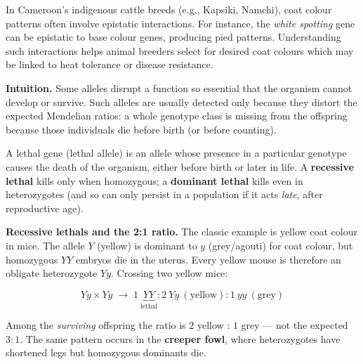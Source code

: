 \documentclass[11pt]{article}
\newcommand{\cle}[1]{{\popxbold\color{popdark}#1}}
\newcounter{popsec}
\newcounter{popsub}
\newcommand{\courssub}[1]{%
  \stepcounter{popsub}%
  \par\vspace{9pt}\noindent{\popxbold\fontsize{11.5}{13}\selectfont\color{popink}{\color{poporange}\thepopsec.\thepopsub}\hspace{6pt}#1}\par\nopagebreak\vspace{4pt}
}
\begin{document}
\begin{savaistu}
In Cameroon's indigenous cattle breeds (e.g., Kapsiki, Namchi), coat colour patterns often involve epistatic interactions. For instance, the \emph{white spotting} gene can be epistatic to base colour genes, producing pied patterns. Understanding such interactions helps animal breeders select for desired coat colours which may be linked to heat tolerance or disease resistance.
\end{savaistu}

\courssub{Lethal Genes}

\textbf{Intuition.} Some alleles disrupt a function so essential that the organism cannot develop or survive. Such alleles are usually detected only because they distort the expected Mendelian ratios: a whole genotype class is missing from the offspring because those individuals die before birth (or before counting).

\begin{definition}
A \cle{lethal gene} (lethal allele) is an allele whose presence in a particular genotype causes the death of the organism, either before birth or later in life. A \textbf{recessive lethal} kills only when homozygous; a \textbf{dominant lethal} kills even in heterozygotes (and so can only persist in a population if it acts \emph{late}, after reproductive age).
\end{definition}

\textbf{Recessive lethals and the 2:1 ratio.} The classic example is yellow coat colour in mice. The allele $Y$ (yellow) is dominant to $y$ (grey/agouti) for coat colour, but homozygous $YY$ embryos die in the uterus. Every yellow mouse is therefore an obligate heterozygote $Yy$. Crossing two yellow mice:

\[ Yy \times Yy \;\longrightarrow\; 1\ \underbrace{YY}_{\text{lethal}} : 2\ Yy\ (\text{yellow}) : 1\ yy\ (\text{grey}) \]

Among the \emph{surviving} offspring the ratio is $2$ yellow : $1$ grey — not the expected $3:1$. The same pattern occurs in the \textbf{creeper fowl}, where heterozygotes have shortened legs but homozygous dominants die.
\end{document}
